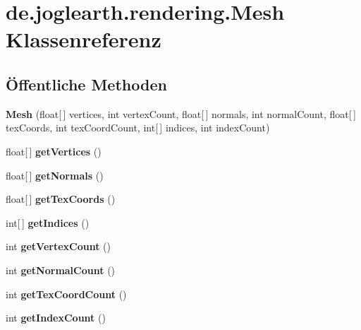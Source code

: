 \section{de.\-joglearth.\-rendering.\-Mesh Klassenreferenz}
\label{classde_1_1joglearth_1_1rendering_1_1_mesh}
\subsection*{Öffentliche Methoden}
\begin{DoxyCompactItemize}
\item 
{\bfseries Mesh} (float[$\,$] vertices, int vertex\-Count, float[$\,$] normals, int normal\-Count, float[$\,$] tex\-Coords, int tex\-Coord\-Count, int[$\,$] indices, int index\-Count)\label{classde_1_1joglearth_1_1rendering_1_1_mesh_ad05e0bc3b1b76c9916447e2990f03ed5}

\item 
float[$\,$] {\bfseries get\-Vertices} ()\label{classde_1_1joglearth_1_1rendering_1_1_mesh_a3601272bedd6b791e7613039db7dc7f3}

\item 
float[$\,$] {\bfseries get\-Normals} ()\label{classde_1_1joglearth_1_1rendering_1_1_mesh_a2898c981a4d765303f2de303c8254ec9}

\item 
float[$\,$] {\bfseries get\-Tex\-Coords} ()\label{classde_1_1joglearth_1_1rendering_1_1_mesh_adefd50f84de1f71a711abcfdc6b4315b}

\item 
int[$\,$] {\bfseries get\-Indices} ()\label{classde_1_1joglearth_1_1rendering_1_1_mesh_aaa0a71b75ae412b779be13535110ca1f}

\item 
int {\bfseries get\-Vertex\-Count} ()\label{classde_1_1joglearth_1_1rendering_1_1_mesh_a578e1c954c3e243e7a03cbff44ff8595}

\item 
int {\bfseries get\-Normal\-Count} ()\label{classde_1_1joglearth_1_1rendering_1_1_mesh_a0e162805f813eaa7e1d64cfdf067dc6b}

\item 
int {\bfseries get\-Tex\-Coord\-Count} ()\label{classde_1_1joglearth_1_1rendering_1_1_mesh_aeb135f6a831b2897c4c290dec52031d4}

\item 
int {\bfseries get\-Index\-Count} ()\label{classde_1_1joglearth_1_1rendering_1_1_mesh_ab8e5a2887ff115d17016dba339b11c8a}

\end{DoxyCompactItemize}
